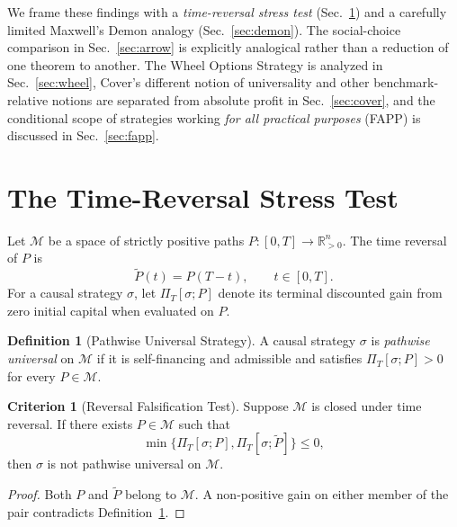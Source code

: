 \documentclass[aps,pra,reprint,superscriptaddress,amsmath,amssymb,floatfix]{revtex4-2}
\theoremstyle{plain}
\theoremstyle{definition}
\newtheorem{definition}{Definition}
\newtheorem{criterion}{Criterion}
\theoremstyle{remark}
\begin{document}
We frame these findings with a \emph{time-reversal stress test}
(Sec.~\ref{sec:criterion}) and a carefully limited Maxwell's Demon analogy
(Sec.~\ref{sec:demon}). The social-choice comparison in
Sec.~\ref{sec:arrow} is explicitly analogical rather than a reduction of one
theorem to another. The Wheel Options Strategy is analyzed in
Sec.~\ref{sec:wheel}, Cover's different notion of universality and other
benchmark-relative notions are separated from absolute profit in
Sec.~\ref{sec:cover}, and the conditional scope of strategies working
\emph{for all practical purposes} (FAPP) is discussed in Sec.~\ref{sec:fapp}.

\section{The Time-Reversal Stress Test}
\label{sec:criterion}

Let \(\mathcal{M}\) be a space of strictly positive paths
\(P\colon[0,T]\to\mathbb{R}_{>0}^n\). The time reversal of \(P\) is
\begin{equation}
  \widetilde{P}(t)=P(T-t), \qquad t\in[0,T].
  \label{eq:timereversal}
\end{equation}
For a causal strategy \(\sigma\), let \(\Pi_T[\sigma;P]\) denote its terminal
discounted gain from zero initial capital when evaluated on \(P\).

\begin{definition}[Pathwise Universal Strategy]
\label{def:universal}
  A causal strategy \(\sigma\) is \emph{pathwise universal} on
  \(\mathcal{M}\) if it is self-financing and admissible and satisfies
  \(\Pi_T[\sigma;P]>0\) for every \(P\in\mathcal{M}\).
\end{definition}

\begin{criterion}[Reversal Falsification Test]
  \label{crit:tr}
  Suppose \(\mathcal{M}\) is closed under time reversal. If there exists
  \(P\in\mathcal{M}\) such that
  \begin{equation}
    \min\{\Pi_T[\sigma;P],\Pi_T[\sigma;\widetilde P]\}\leq 0,
    \label{eq:reversaltest}
  \end{equation}
  then \(\sigma\) is not pathwise universal on \(\mathcal{M}\).
\end{criterion}

\begin{proof}
Both \(P\) and \(\widetilde P\) belong to \(\mathcal{M}\). A non-positive gain
on either member of the pair contradicts Definition~\ref{def:universal}.
\end{proof}
\end{document}
